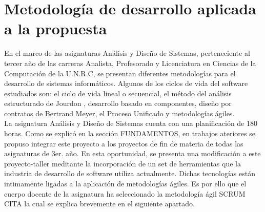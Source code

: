 \section{Metodología de desarrollo aplicada a la propuesta} \label{metodologia}
En el marco de las asignaturas Análisis y Diseño de Sistemas, perteneciente al tercer año de las carreras Analista, Profesorado y 
 Licenciatura en Ciencias de la Computación de la U.N.R.C, se presentan diferentes metodologías para el desarrollo de 
sistemas informáticos. Algunos de los ciclos de vida del software estudiados son:  el ciclo de vida lineal o secuencial, el método del análisis estructurado de Jourdon\cite{}
, desarrollo basado en componentes, diseño por contratos\cite{} de Bertrand Meyer, el Proceso Unificado \cite{} y metodologías ágiles.\\ 
 
La asignatura Análisis y Diseño de Sistemas cuenta con una planificación de 180 horas. Como se explicó en la sección FUNDAMENTOS, 
en trabajos ateriores se propuso
integrar este proyecto a los proyectos de fin de materia de todas las asignaturas de 3er. año. En esta oportunidad, se presenta 
una modificación a este proyecto-taller meditante la incorporación de un set de herramientas 
que la industria de desarrollo de software utiliza actualmente. Dichas tecnologías están intimamente ligadas a la aplicación de metodologías ágiles. 
Es por ello que el cuerpo docente de la asignatura ha seleccionado la metodología ágil SCRUM  CITA  la cual se explica brevemente en el siguiente apartado.


